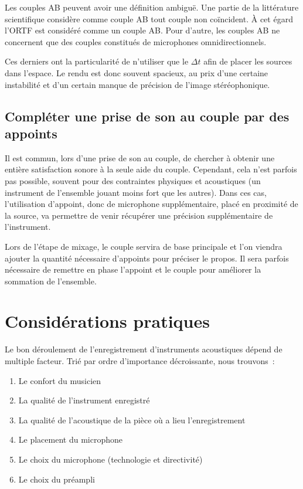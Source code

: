 \documentclass[
]{book}
\providecommand{\tightlist}{%
  \setlength{\itemsep}{0pt}\setlength{\parskip}{0pt}}
\begin{document}
Les couples AB peuvent avoir une définition ambiguë. Une partie de la littérature scientifique considère comme couple AB tout couple non coïncident. À cet égard l'ORTF est considéré comme un couple AB. Pour d'autre, les couples AB ne concernent que des couples constitués de microphones omnidirectionnels.

Ces derniers ont la particularité de n'utiliser que le \(\Delta t\) afin de placer les sources dans l'espace. Le rendu est donc souvent spacieux, au prix d'une certaine instabilité et d'un certain manque de précision de l'image stéréophonique.

\hypertarget{compluxe9ter-une-prise-de-son-au-couple-par-des-appoints}{%
\section{Compléter une prise de son au couple par des appoints}\label{compluxe9ter-une-prise-de-son-au-couple-par-des-appoints}}

Il est commun, lors d'une prise de son au couple, de chercher à obtenir une entière satisfaction sonore à la seule aide du couple. Cependant, cela n'est parfois pas possible, souvent pour des contraintes physiques et acoustiques (un instrument de l'ensemble jouant moins fort que les autres). Dans ces cas, l'utilisation d'appoint, donc de microphone supplémentaire, placé en proximité de la source, va permettre de venir récupérer une précision supplémentaire de l'instrument.

Lors de l'étape de mixage, le couple servira de base principale et l'on viendra ajouter la quantité nécessaire d'appoints pour préciser le propos. Il sera parfois nécessaire de remettre en phase l'appoint et le couple pour améliorer la sommation de l'ensemble.

\hypertarget{considuxe9rations-pratiques}{%
\chapter{Considérations pratiques}\label{considuxe9rations-pratiques}}

Le bon déroulement de l'enregistrement d'instruments acoustiques dépend de multiple facteur. Trié par ordre d'importance décroissante, nous trouvons~:

\begin{enumerate}
\def\labelenumi{\arabic{enumi}.}
\tightlist
\item
  Le confort du musicien
\item
  La qualité de l'instrument enregistré
\item
  La qualité de l'acoustique de la pièce où a lieu l'enregistrement
\item
  Le placement du microphone
\item
  Le choix du microphone (technologie et directivité)
\item
  Le choix du préampli
\end{enumerate}
\end{document}
